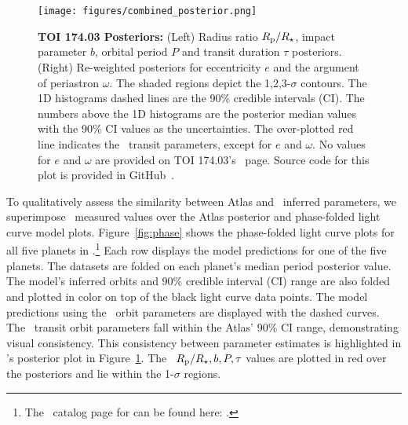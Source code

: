 \documentclass[floatfix,ApJL,twocolumn]{aastex631}
\begin{document}
\begin{figure}\label{fig:posteriors}
    \centering
    \texttt{[image: figures/combined\_posterior.png]}
    \caption{\textbf{TOI 174.03 Posteriors:} (Left) Radius ratio $R_{\rm p}/R_\star$, impact parameter $b$, orbital period $P$ and transit duration $\tau$ posteriors. (Right) Re-weighted posteriors for eccentricity $e$ and the argument of periastron $\omega$.
    The shaded regions depict the 1,2,3-$\sigma$ contours. The 1D histograms dashed lines are the 90\% credible intervals (CI).
    The numbers above the 1D histograms are the posterior median values with the 90\% CI values as the uncertainties.
    The over-plotted red line indicates the \exofop\ transit parameters, except for $e$ and $\omega$.
    No values for $e$ and $\omega$ are provided on {TOI 174.03}'s \exofop\ page.
    Source code for this plot is provided in GitHub~\paperPlotsLink.}
\end{figure}


To qualitatively assess the similarity between Atlas and \exofop\ inferred parameters, we superimpose \exofop\ measured values over the Atlas posterior and phase-folded light curve model plots.
Figure~\ref{fig:phase} shows the phase-folded light curve plots for all five planets in .\footnote{The \tessAtlas\ catalog page for  can be found here: .}
Each row displays the model predictions for one of the five planets.
The datasets are folded on each planet's median period posterior value.
The model's inferred orbits and 90\% credible interval (CI) range are also folded and plotted in color on top of the black light curve data points.
The model predictions using the \exofop\ orbit parameters are displayed with the dashed curves.
The \exofop\ transit orbit parameters fall within the Atlas' 90\% CI range, demonstrating visual consistency.
This consistency between parameter estimates is highlighted in 's posterior plot in Figure~\ref{fig:posteriors}.
The \exofop\ $R_{\rm p}/R_{\star}, b, P, \tau$ values are plotted in red over the posteriors and lie within the 1-$\sigma$ regions.
\end{document}
